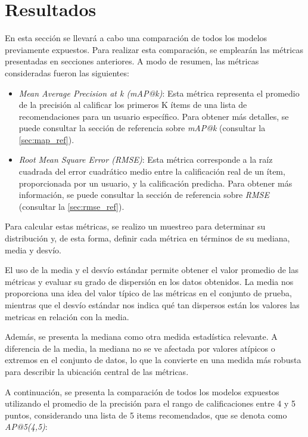 \documentclass[11pt,a4paper,twoside]{thesis}
\begin{document}
\chapter{Resultados}

En esta sección se llevará a cabo una comparación de todos los modelos
previamente expuestos. Para realizar esta comparación, se emplearán las
métricas presentadas en secciones anteriores. A modo de resumen, las métricas
consideradas fueron las siguientes:

\begin{itemize}
	\item \textit{Mean Average Precision at k (mAP@k)}: Esta métrica
	      representa el promedio de la precisión al calificar los primeros
	      K ítems de una lista de recomendaciones para un usuario específico.
	      Para obtener más detalles, se puede consultar la sección de
	      referencia sobre \textit{mAP@k} (consultar la \autoref{sec:map_ref}).
	\item \textit{Root Mean Square Error (RMSE)}: Esta métrica
	      corresponde a la raíz cuadrada del error cuadrático medio entre
	      la calificación real de un ítem, proporcionada por un usuario,
	      y la calificación predicha. Para obtener más información, se
	      puede consultar la sección de referencia sobre \textit{RMSE}
	      (consultar la \autoref{sec:rmse_ref}).
\end{itemize}

Para calcular estas métricas, se realizo un muestreo para determinar su
distribución y, de esta forma, definir cada métrica en términos de su mediana,
media y desvío.

El uso de la media y el desvío estándar permite obtener el valor promedio de
las métricas y evaluar su grado de dispersión en los datos obtenidos. La media
nos proporciona una idea del valor típico de las métricas en el conjunto de
prueba, mientras que el desvío estándar nos indica qué tan dispersos están los
valores las metricas en relación con la media.

Además, se presenta la mediana como otra medida estadística relevante. A
diferencia de la media, la mediana no se ve afectada por valores atípicos o
extremos en el conjunto de datos, lo que la convierte en una medida más robusta
para describir la ubicación central de las métricas.

A continuación, se presenta la comparación de todos los modelos expuestos
utilizando el promedio de la precisión para el rango de calificaciones entre 4
y 5 puntos, considerando una lista de 5 items recomendados, que se denota como
\textit{AP@5(4,5)}:
\end{document}

